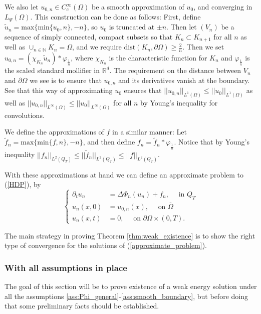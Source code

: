 \documentclass[11pt, a4paper]{article}
\begin{document}
We also let $u_{0,n}\in C^\infty_c(\Omega)$ be a smooth approximation of $u_0$, and converging in $L_\Psi(\Omega)$.
This construction can be done as follows: First, define $\tilde{u}_n = \mathrm{max}\{ \mathrm{min}\{u_0, n\}, -n\}$, so $u_0$ is truncated at $\pm n$. Then let $(V_n)$ be a sequence of simply connected, compact subsets so that $K_n \subset K_{n+1}$ for all $n$ as well as $\cup_{n\in \mathbb{N}}K_n = \Omega$, and we require $\mathrm{dist}(K_n,\partial \Omega) \geq \frac{2}{n}$. Then we set $u_{0,n}= (\chi_{K_n}\tilde{u}_n)*\varphi_{\frac{1}{n}}$, where $\chi_{K_n}$ is the characteristic function for $K_n$ and $\varphi_{\frac{1}{n}}$ is the scaled standard mollifier in $\mathbb{R}^d$. The requirement on the distance between $V_n$ and $\partial \Omega$ we see is to ensure that $u_{0,n}$ and its derivatives vanish at the boundary. See that this way of approximating $u_0$ ensures that $||u_{0,n}||_{L^1(\Omega)} \leq ||u_0||_{L^1(\Omega)}$ as well as $||u_{0,n}||_{L^\infty(\Omega)} \leq ||u_0||_{L^\infty(\Omega)}$ for all $n$ by Young's inequality for convolutions.

We define the approximations of $f$ in a similar manner: Let $\tilde{f}_n = \mathrm{max}\{ \mathrm{min}\{f,n \}, -n\}$, and then define $f_n = \tilde{f}_n * \varphi_{\frac{1}{n}}$.
Notice that by Young's inequality $||f_n||_{L^2(Q_T)} \leq ||\tilde{f}_n||_{L^2(Q_T)} \leq ||f||_{L^2(Q_T)}$.

With these approximations at hand we can define an approximate problem to (\ref{HDP}), by
 \begin{equation}
	\label{approximate_problem}
	\begin{cases}
	\partial_t u_n &= \Delta\Phi_n(u_n) + f_n, \quad \text{ in } Q_T \\
	u_n(x,0) &= u_{0,n}(x),	\quad \text{ on } \overline{\Omega} \\
	u_n(x,t) &= 0, \quad \text{ on }  \partial \Omega \times (0,T).
	\end{cases}
\end{equation}


The main strategy in proving Theorem \ref{thm:weak_existence} is to show the right type of convergence for the solutions of (\ref{approximate_problem}). 
\subsubsection{With all assumptions in place}
The goal of this section will be to prove existence of a weak energy solution under all the assumptions \ref{ass:Phi_general}-\ref{ass:smooth_boundary}, but before doing that some preliminary facts should be established.
\end{document}
